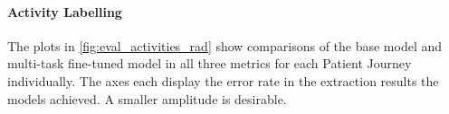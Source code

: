 \paragraph{Activity Labelling} The plots in \autoref{fig:eval_activities_rad} show comparisons of the base model and multi-task fine-tuned model in all three metrics for each Patient Journey individually. The axes each display the error rate in the extraction results the models achieved. A smaller amplitude is desirable.\\
\begin{figure}
  \centering

\end{figure}
